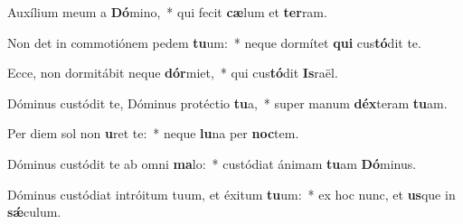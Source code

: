\item Auxílium meum a \textbf{Dó}mino,~* qui fecit \textbf{cæ}lum et \textbf{ter}ram.
\item Non det in commotiónem pedem \textbf{tu}um:~* neque dormítet \textbf{qui} cus\textbf{tó}dit te.
\item Ecce, non dormitábit neque \textbf{dór}miet,~* qui cus\textbf{tó}dit \textbf{Is}raël.
\item Dóminus custódit te, Dóminus protéctio \textbf{tu}a,~* super manum \textbf{déx}teram \textbf{tu}am.
\item Per diem sol non \textbf{u}ret te:~* neque \textbf{lu}na per \textbf{noc}tem.
\item Dóminus custódit te ab omni \textbf{ma}lo:~* custódiat ánimam \textbf{tu}am \textbf{Dó}minus.
\item Dóminus custódiat intróitum tuum, et éxitum \textbf{tu}um:~* ex hoc nunc, et \textbf{us}que in \textbf{sǽ}culum.
